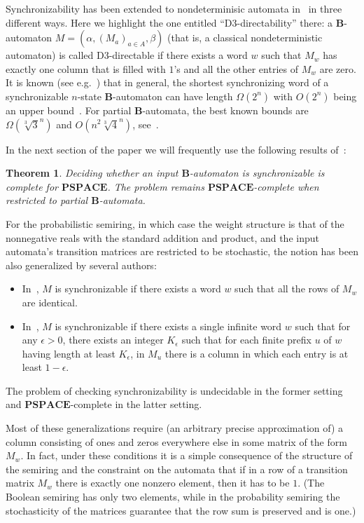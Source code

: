 \documentclass[submission,copyright,creativecommons]{eptcs}
\def\bB{{\mathbf{B}}}
\theoremstyle{plain}
\newtheorem{theorem}{Theorem}
\theoremstyle{definition}
\theoremstyle{remark}
\begin{document}
Synchronizability has been extended to nondeterminisic automata in~\cite{imreh} in three different ways.
Here we highlight the one entitled ``D3-directability'' there: a $\bB$-automaton $M=(\alpha,(M_a)_{a\in A},\beta)$
(that is, a classical nondeterministic automaton)
is called D3-directable if there exists a word $w$ such that $M_w$ has exactly one column that is filled with $1$'s and
all the other entries of $M_w$ are zero.
It is known (see e.g.~\cite{imreh}) that in general, the shortest synchronizing word of a synchronizable $n$-state $\bB$-automaton
can have length $\Omega(2^n)$ with $O(2^n)$ being an upper bound~\cite{gazdag}.
For partial $\bB$-automata, the best known bounds are $\Omega(\sqrt[3]{3}^n)$ and $O(n^2\sqrt[3]{4}^n)$, see~\cite{martyugin-bound,gazdag}.

In the next section of the paper we will frequently use the following results of~\cite{martyugin-pspace}:
\begin{theorem}
\label{thm-marty}
Deciding whether an input $\bB$-automaton is synchronizable is complete for $\mathbf{PSPACE}$.
The problem remains $\mathbf{PSPACE}$-complete when restricted to partial $\bB$-automata.
\end{theorem}

For the probabilistic semiring, in which case the weight structure is that of the nonnegative reals with the standard addition and product,
and the input automata's transition matrices are restricted to be stochastic, the notion has been also generalized by several authors:
\begin{itemize}
\item In~\cite{kfouri}, $M$ is synchronizable if there exists a word $w$ such that all the rows of $M_w$ are identical.
\item In~\cite{doyen}, $M$ is synchronizable if there exists a single infinite word $w$ such that for any $\epsilon>0$,
  there exists an integer $K_\epsilon$ such that for each finite prefix $u$ of $w$ having length at least $K_\epsilon$,
  in $M_u$ there is a column in which each entry is at least $1-\epsilon$.
\end{itemize}
The problem of checking synchronizability is undecidable in the former setting and ${\mathbf{PSPACE}}$-complete in the latter setting.

Most of these generalizations require (an arbitrary precise approximation of) a column consisting of ones and
zeros everywhere else in some matrix of the form $M_w$. In fact, under these conditions it is a simple consequence of the structure of
the semiring and the constraint on the automata that if in a row of a transition matrix $M_w$ there is exactly one nonzero element,
then it has to be $1$. (The Boolean semiring has only two elements, while in the probability semiring the stochasticity of the matrices
guarantee that the row sum is preserved and is one.)
\end{document}
